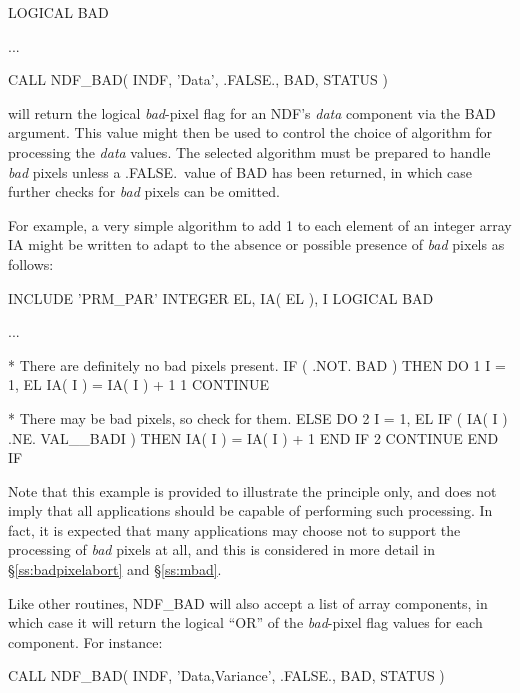 \documentclass[twoside,11pt,nolof]{starlink}
\providecommand{\st}[1]{{\emph{#1}}}
\begin{document}
\small
\begin{terminalv}
      LOGICAL BAD

      ...

      CALL NDF_BAD( INDF, 'Data', .FALSE., BAD, STATUS )
\end{terminalv}
\normalsize

will return the logical \st{bad\/}-pixel flag for an NDF's \st{data\/} component
via the BAD argument.
This value might then be used to control the choice of algorithm for
processing the \st{data\/} values.
The selected algorithm must be prepared to handle \st{bad\/} pixels unless a
.FALSE.\ value of BAD has been returned, in which case further checks
for \st{bad\/} pixels can be omitted.

For example, a very simple algorithm to add 1 to each element of an integer
array IA might be written to adapt to the absence or possible presence of
\st{bad\/} pixels as follows:

\small
\begin{terminalv}
      INCLUDE 'PRM_PAR'
      INTEGER EL, IA( EL ), I
      LOGICAL BAD

      ...

*  There are definitely no bad pixels present.
      IF ( .NOT. BAD ) THEN
         DO 1 I = 1, EL
            IA( I ) = IA( I ) + 1
 1       CONTINUE

*  There may be bad pixels, so check for them.
      ELSE
         DO 2 I = 1, EL
            IF ( IA( I ) .NE. VAL__BADI ) THEN
               IA( I ) = IA( I ) + 1
            END IF
 2       CONTINUE
      END IF
\end{terminalv}
\normalsize

Note that this example is provided to illustrate the principle only, and
does not imply that all applications should be capable of performing such
processing.
In fact, it is expected that many applications may choose not to support the
processing of \st{bad\/} pixels at all, and this is considered in more detail
in \S\ref{ss:badpixelabort} and \S\ref{ss:mbad}.

Like other routines, NDF\_BAD will also accept a list of array components,
in which case it will return the logical ``OR'' of the \st{bad\/}-pixel flag
values for each component.
For instance:

\small
\begin{terminalv}
      CALL NDF_BAD( INDF, 'Data,Variance', .FALSE., BAD, STATUS )
\end{terminalv}
\normalsize
\end{document}
